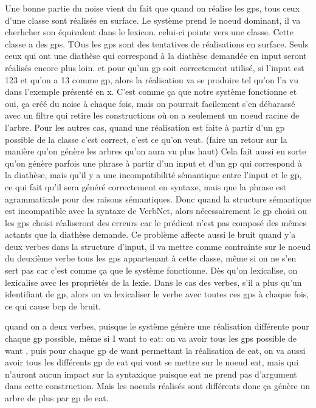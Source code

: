 Une bonne partie du noise vient du fait que quand on réalise les gps, tous ceux d'une classe sont réalisés en surface. Le système prend le noeud dominant, il va cherhcher son équivalent dans le lexicon. celui-ci pointe vers une classe. Cette classe a des gps. TOus les gps sont des tentatives de réalisations en surface. Seuls ceux qui ont une diathèse qui correspond à la diathèse demandée en input seront réalisés encore plus loin. et pour qu'un gp soit correctement utilisé, si l'input est 123 et qu'on a 13 comme gp, alors la réalisation va se produire tel qu'on l'a vu dans l'exemple présenté en x. C'est comme ça que notre système fonctionne et oui, ça créé du noise à chaque fois, mais on pourrait facilement s'en débarassé avec un filtre qui retire les constructions où on a seulement un noeud racine de l'arbre. Pour les autres cas, quand une réalisation est faite à partir d'un gp possible de la classe c'est correct, c'est ce qu'on veut. (faire un retour sur la manière qu'on génère les arbres qu'on aura vu plus haut)
Cela fait aussi en sorte qu'on génère parfois une phrase à partir d'un input et d'un gp qui correspond à la diathèse, mais qu'il y a une incompatibilité sémantique entre l'input et le gp, ce qui fait qu'il sera généré correctement en syntaxe, mais que la phrase est agrammaticale pour des raisons sémantiques. Donc quand la structure sémantique est incompatible avec la syntaxe de VerbNet, alors nécessairement le gp choisi ou les gps choisi réaliseront des erreurs car le prédicat n'est pas composé des mêmes actants que la diathèse demande. Ce problème affecte aussi le bruit quand y'a deux verbes dans la structure d'input, il va mettre comme contrainte sur le noeud du deuxième verbe tous les gps appartenant à cette classe, même si on ne s'en sert pas car c'est comme ça que le système fonctionne. Dès qu'on lexicalise, on lexicalise avec les propriétés de la lexie. Dans le cas des verbes, s'il a plus qu'un identifiant de gp, alors on va lexicaliser le verbe avec toutes ces gps à chaque fois, ce qui cause bcp de bruit.

quand on a deux verbes, puisque le système génère une réalisation différente pour chaque gp possible, même si I want to eat: on va avoir tous les gps possible de want , puis pour chaque gp de want permettant la réalisation de eat, on va aussi avoir tous les différents gp de eat qui vont se mettre sur le noeud eat, mais qui n'auront aucun impact sur la syntaxique puisque eat ne prend pas d'argument dans cette construction. Mais les noeuds réalisés sont différents donc ça génère un arbre de plus par gp de eat.

